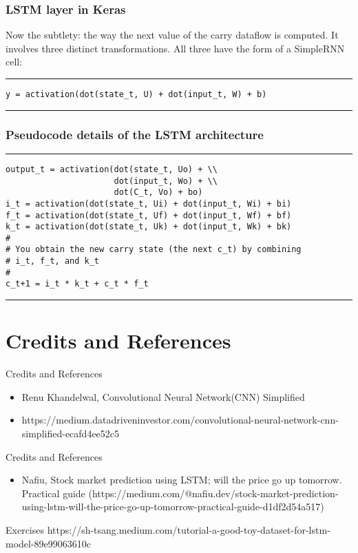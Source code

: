 \documentclass[11pt]{beamer}
\begin{document}
\begin{frame}[fragile]
\frametitle{LSTM layer in Keras}
Now the subtlety: the way the next value of the carry dataflow is computed. It involves three distinct transformations. All three have the form of a SimpleRNN cell:
\newline
\newline
\rule{\textwidth}{1pt}
\begin{verbatim}
y = activation(dot(state_t, U) + dot(input_t, W) + b)
\end{verbatim}
\rule{\textwidth}{1pt}
\newline
\newline
\end{frame}
\begin{frame}[fragile]
\frametitle{Pseudocode details of the LSTM architecture}
\rule{\textwidth}{1pt}
\begin{verbatim}
output_t = activation(dot(state_t, Uo) + \\
                      dot(input_t, Wo) + \\
                      dot(C_t, Vo) + bo)
i_t = activation(dot(state_t, Ui) + dot(input_t, Wi) + bi)
f_t = activation(dot(state_t, Uf) + dot(input_t, Wf) + bf)
k_t = activation(dot(state_t, Uk) + dot(input_t, Wk) + bk)
#
# You obtain the new carry state (the next c_t) by combining 
# i_t, f_t, and k_t
#
c_t+1 = i_t * k_t + c_t * f_t
\end{verbatim}
\rule{\textwidth}{1pt}
\end{frame}
%
\section{Credits and References \\ \scalebox{0.8}{}}
%
\begin{frame}{Credits and References}
	\begin{itemize}
		\item Renu Khandelwal, Convolutional Neural Network(CNN) Simplified 
		\item https://medium.datadriveninvestor.com/convolutional-neural-network-cnn-simplified-ecafd4ee52c5
	\end{itemize}
\end{frame}
\begin{frame}{Credits and References}
	\begin{itemize}
		\item Nafiu, Stock market prediction using LSTM; will the price go up tomorrow. Practical guide (https://medium.com/@nafiu.dev/stock-market-prediction-using-lstm-will-the-price-go-up-tomorrow-practical-guide-d1df2d54a517)
	\end{itemize}
\end{frame}
\begin{frame}{Exercises}
	https://sh-tsang.medium.com/tutorial-a-good-toy-dataset-for-lstm-model-89e99063610c
\end{frame}
\end{document}
